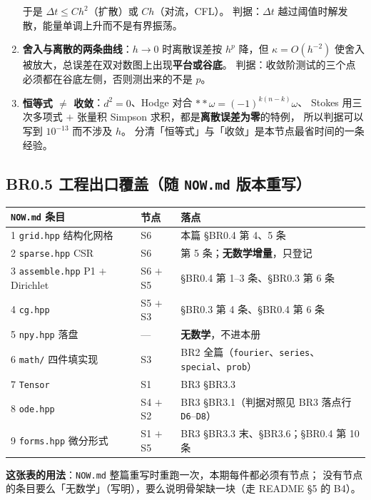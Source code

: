 \begin{enumerate}[leftmargin=1.5em]
        于是 $\Delta t\le Ch^{2}$（扩散）或 $Ch$（对流，CFL）。
        判据：$\Delta t$ 越过阈值时解发散，能量单调上升而不是有界振荡。
  \item \textbf{舍入与离散的两条曲线}：$h\to0$ 时离散误差按 $h^{p}$ 降，但 $\kappa=O(h^{-2})$
        使舍入被放大，总误差在双对数图上出现\textbf{平台或谷底}。
        判据：收敛阶测试的三个点必须都在谷底左侧，否则测出来的不是 $p$。
  \item \textbf{恒等式 $\ne$ 收敛}：$d^{2}=0$、Hodge 对合 $**\omega=(-1)^{k(n-k)}\omega$、
        Stokes 用三次多项式 $+$ 张量积 Simpson 求积，都是\textbf{离散误差为零}的特例，
        所以判据可以写到 $10^{-13}$ 而不涉及 $h$。
        分清「恒等式」与「收敛」是本节点最省时间的一条经验。
\end{enumerate}

\subsection{BR0.5 工程出口覆盖（随 \texttt{NOW.md} 版本重写）}

\begin{center}
\small
\begin{tabular}{L{4.4cm}L{1.8cm}L{6.6cm}}
\toprule
\texttt{NOW.md} 条目 & 节点 & 落点 \\
 \texttt{grid.hpp} 结构化网格 & S6 & 本篇 §BR0.4 第 4、5 条 \\
2 \texttt{sparse.hpp} CSR & S6 & 第 5 条；\textbf{无数学增量}，只登记 \\
3 \texttt{assemble.hpp} P1 $+$ Dirichlet & S6 $+$ S5 & §BR0.4 第 1–3 条、§BR0.3 第 6 条 \\
4 \texttt{cg.hpp} & S5 $+$ S3 & §BR0.3 第 4 条、§BR0.4 第 6 条 \\
5 \texttt{npy.hpp} 落盘 & — & \textbf{无数学}，不进本册 \\
6 \texttt{math/} 四件填实现 & S3 & BR2 全篇（\texttt{fourier}、\texttt{series}、\texttt{special}、\texttt{prob}）\\
7 \texttt{Tensor} & S1 & BR3 §BR3.3 \\
8 \texttt{ode.hpp} & S4 $+$ S2 & BR3 §BR3.1（判据对照见 BR3 落点行 \texttt{D6}--\texttt{D8}）\\
9 \texttt{forms.hpp} 微分形式 & S1 $+$ S5 & BR3 §BR3.3 末、§BR3.6；§BR0.4 第 10 条 \\
\bottomrule
\end{tabular}
\end{center}

\textbf{这张表的用法}：\texttt{NOW.md} 整篇重写时重跑一次，本期每件都必须有节点；
没有节点的条目要么「无数学」（写明），要么说明骨架缺一块（走 README §5 的 B4）。


